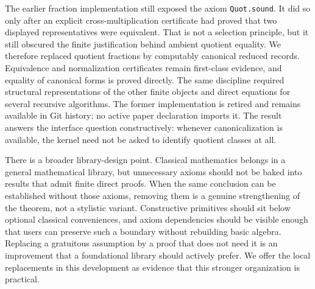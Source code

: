 \documentclass[11pt]{article}
\begin{document}
The earlier fraction implementation still exposed the axiom
\texttt{Quot.sound}.  It did so only after an explicit cross-multiplication
certificate had proved that two displayed representatives were equivalent.
That is not a selection principle, but it still obscured the finite
justification behind ambient quotient equality.  We therefore replaced
quotient fractions by computably canonical reduced records.  Equivalence and
normalization certificates remain first-class evidence, and equality of
canonical forms is proved directly.  The same discipline required structural
representations of the other finite objects and direct equations for several
recursive algorithms.
The former implementation is retired and remains available in Git history;
no active paper declaration imports it.  The result answers the interface
question constructively: whenever canonicalization is available, the kernel
need not be asked to identify quotient classes at all.

There is a broader library-design point.  Classical mathematics belongs in a
general mathematical library, but unnecessary axioms should
not be baked into results that admit finite direct proofs.  When the same
conclusion can be established without those axioms, removing them is a genuine
strengthening of the theorem, not a stylistic variant.  Constructive
primitives should sit below optional classical conveniences, and axiom
dependencies should be visible enough that users can preserve such a
boundary without rebuilding basic algebra.  Replacing a gratuitous
assumption by a proof that does not need it is an improvement that a
foundational library should actively prefer.  We offer the local replacements
in this development as evidence that this stronger organization is
practical.

\newpage
\end{document}

